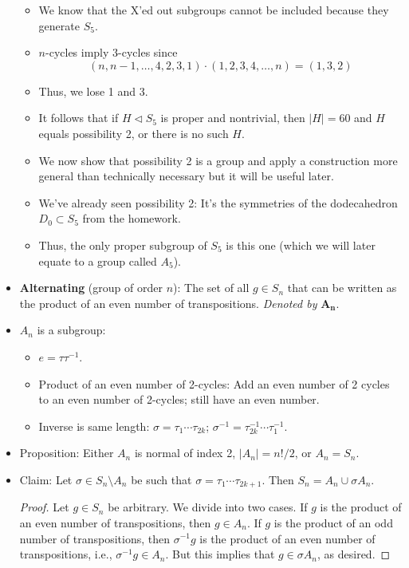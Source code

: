 \documentclass[../notes.tex]{subfiles}
\begin{document}
\begin{itemize}
\begin{itemize}
        \item We know that the X'ed out subgroups cannot be included because they generate $S_5$.
        \item $n$-cycles imply 3-cycles since
        \begin{equation*}
            (n,n-1,\dots,4,2,3,1)\cdot(1,2,3,4,\dots,n) = (1,3,2)
        \end{equation*}
        \item Thus, we lose 1 and 3.
        \item It follows that if $H\triangleleft S_5$ is proper and nontrivial, then $|H|=60$ and $H$ equals possibility 2, or there is no such $H$.
        \item We now show that possibility 2 is a group and apply a construction more general than technically necessary but it will be useful later.
        \item We've already seen possibility 2: It's the symmetries of the dodecahedron $D_0\subset S_5$ from the homework.
        \item Thus, the only proper subgroup of $S_5$ is this one (which we will later equate to a group called $A_5$).
    \end{itemize}
    \item \textbf{Alternating} (group of order $n$): The set of all $g\in S_n$ that can be written as the product of an even number of transpositions. \emph{Denoted by} $\bm{A_n}$.
    \item $A_n$ is a subgroup:
    \begin{itemize}
        \item $e=\tau\tau^{-1}$.
        \item Product of an even number of 2-cycles: Add an even number of 2 cycles to an even number of 2-cycles; still have an even number.
        \item Inverse is same length: $\sigma=\tau_1\cdots\tau_{2k}$; $\sigma^{-1}=\tau_{2k}^{-1}\cdots\tau_1^{-1}$.
    \end{itemize}
    \item Proposition: Either $A_n$ is normal of index 2, $|A_n|=n!/2$, or $A_n=S_n$.
    \item Claim: Let $\sigma\in S_n\setminus A_n$ be such that $\sigma=\tau_1\cdots\tau_{2k+1}$. Then $S_n=A_n\cup\sigma A_n$.
    \begin{proof}
        Let $g\in S_n$ be arbitrary. We divide into two cases. If $g$ is the product of an even number of transpositions, then $g\in A_n$. If $g$ is the product of an odd number of transpositions, then $\sigma^{-1}g$ is the product of an even number of transpositions, i.e., $\sigma^{-1}g\in A_n$. But this implies that $g\in\sigma A_n$, as desired.

\end{proof}
\end{itemize}
\end{document}
